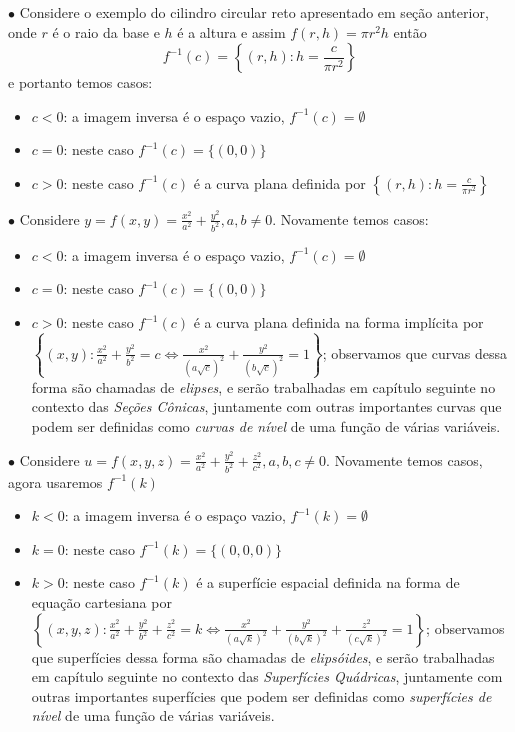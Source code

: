 $\bullet$ 
Considere o exemplo do cilindro circular reto apresentado em seção anterior, onde $r$ é o raio da base e $h$ é a altura e assim $f(r,h) = \pi r^2 h $ então
\begin{equation}
   f^{-1}(c) = \left\{ (r,h) : h = \frac{c}{\pi r^2} \right\}
\end{equation}
e portanto temos casos:
\begin{itemize}
\item[(i)]{$c < 0$:  a imagem inversa é o espaço vazio, $f^{-1}(c) = \emptyset$}
\item[(ii)]{$ c = 0$: neste caso  $f^{-1}(c) = \{ (0,0) \}$}
\item[(iii)]{$ c > 0 $: neste caso $f^{-1}(c)$ é a curva plana definida por
$\left\{ (r,h) : h = \frac{c}{\pi r^2}  \right\} $}
\end{itemize}


$\bullet$ Considere $y = f(x,y) = \frac{x^2}{a^2} + \frac{y^2}{b^2}, a,b \neq 0$.  Novamente temos casos:
\begin{itemize}
\item[(i)]{$c < 0$:  a imagem inversa é o espaço vazio, $f^{-1}(c) = \emptyset$}
\item[(ii)]{$ c = 0$: neste caso  $f^{-1}(c) = \{ (0,0) \}$}
\item[(iii)]{$ c > 0 $: neste caso $f^{-1}(c)$ é a curva plana definida na forma implícita por $\left\{ (x,y) : \frac{x^2}{a^2} + \frac{y^2}{b^2}= c \Leftrightarrow \frac{x^2}{(a \sqrt{c})^2} + \frac{y^2}{(b\sqrt{c})^2} = 1  \right\} $; observamos que curvas dessa forma são chamadas de {\it elipses}, e serão trabalhadas em capítulo seguinte no contexto das {\it Seções Cônicas}, juntamente com outras importantes curvas que podem ser definidas como {\it curvas de nível} de uma função de várias variáveis.}
\end{itemize}

$\bullet$ Considere $u = f(x,y,z) = \frac{x^2}{a^2} + \frac{y^2}{b^2} + \frac{z^2}{c^2}, a,b,c \neq 0$.  Novamente temos casos, agora usaremos $f^{-1}(k)$
\begin{itemize}
\item[(i)]{$k < 0$:  a imagem inversa é o espaço vazio, $f^{-1}(k) = \emptyset$}
\item[(ii)]{$ k = 0$: neste caso  $f^{-1}(k) = \{ (0,0,0) \}$}
\item[(iii)]{$ k > 0 $: neste caso $f^{-1}(k)$ é a superfície espacial definida na forma de equação cartesiana  por $\left\{ (x,y,z) : \frac{x^2}{a^2} + \frac{y^2}{b^2} + \frac{z^2}{c^2} = k \Leftrightarrow \frac{x^2}{(a \sqrt{k})^2} + \frac{y^2}{(b\sqrt{k})^2} + \frac{z^2}{(c \sqrt{k})^2} = 1  \right\} $; observamos que superfícies dessa forma são chamadas de {\it elipsóides}, e serão trabalhadas em capítulo seguinte no contexto das {\it Superfícies Quádricas}, juntamente com outras importantes superfícies que podem ser definidas como {\it superfícies de nível} de uma função de várias variáveis.}
\end{itemize}


